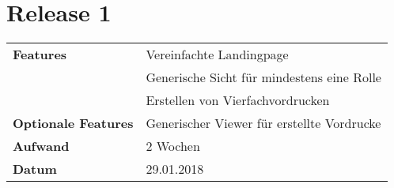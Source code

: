 \section*{Release 1 }
\label{sec:release_1}

\begin{tabular}{p{5cm} p{9cm}}
    \textbf{Features} & Vereinfachte Landingpage \\
    & Generische Sicht für mindestens eine Rolle \\
    & Erstellen von Vierfachvordrucken \\
    \textbf{Optionale Features} & Generischer Viewer für erstellte Vordrucke \\
    \hline
    \textbf{Aufwand} & 2 Wochen \\
    \hline
    \textbf{Datum} & 29.01.2018
\end{tabular}

